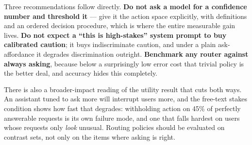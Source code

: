 Three recommendations follow directly. {\bf Do not ask a model for a confidence number and
threshold it} --- give it the action space explicitly, with definitions and an ordered decision
procedure, which is where the entire measurable gain lives. {\bf Do not expect a ``this is
high-stakes'' system prompt to buy calibrated caution}; it buys indiscriminate caution, and under a
plain ask-affordance it degrades discrimination outright. {\bf Benchmark any router against always
asking}, because below a surprisingly low error cost that trivial policy is the better deal, and
accuracy hides this completely.

There is also a broader-impact reading of the utility result that cuts both ways. An assistant tuned
to ask more will interrupt users more, and the free-text stakes condition shows how fast that
degrades: withholding action on 45\% of perfectly answerable requests is its own failure mode, and
one that falls hardest on users whose requests only \emph{look} unusual. Routing policies should be
evaluated on contrast sets, not only on the items where asking is right.
